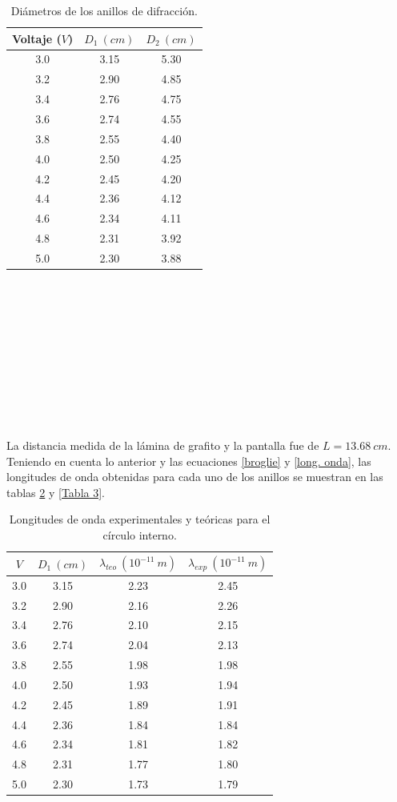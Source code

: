 \documentclass[prb,aps,twocolumn,preprintnumbers,amsmath,amssymb]{revtex4}
\begin{document}
\begin{table}[h!]
	\caption{\label{Tabla 1}Diámetros de los anillos de difracción.}
	\begin{ruledtabular}
		\begin{tabular}{|ccc|}
			Voltaje ($V$) & $D_{1}\ (cm)$ & $D_{2}\ (cm)$\\
			\hline
			3.0 & 3.15 & 5.30\\
			3.2 & 2.90 & 4.85\\
			3.4 & 2.76 & 4.75\\
			3.6 & 2.74 & 4.55\\
			3.8 & 2.55 & 4.40\\
			4.0 & 2.50 & 4.25\\
			4.2 & 2.45 & 4.20\\
			4.4 & 2.36 & 4.12\\
			4.6 & 2.34 & 4.11\\
			4.8 & 2.31 & 3.92\\
			5.0 & 2.30 & 3.88\\
		\end{tabular}
	\end{ruledtabular}
\end{table}
\
\\\\\\\\\\\\\\\\\\\\
La distancia medida	de la lámina de grafito y la pantalla fue de $L = 13.68\ cm$. Teniendo en cuenta lo anterior y las ecuaciones \eqref{broglie} y \eqref{long. onda}, las longitudes de onda obtenidas para cada uno de los anillos se muestran en las tablas \ref{Tabla 2} y \ref{Tabla 3}.

\begin{table}[h!]
	\caption{\label{Tabla 2}Longitudes de onda experimentales y teóricas para el círculo interno.}
	\begin{ruledtabular}
		\begin{tabular}{|cccc|}
			$V$ & $D_{1}\ (cm)$ & $\lambda_{teo}\ (10^{-11}\ m)$ & $\lambda_{exp}\ (10^{-11}\ m)$\\
			\hline
			3.0 & 3.15 & 2.23 & 2.45\\
			3.2 & 2.90 & 2.16 & 2.26\\
			3.4 & 2.76 & 2.10 & 2.15\\
			3.6 & 2.74 & 2.04 & 2.13\\
			3.8 & 2.55 & 1.98 & 1.98\\
			4.0 & 2.50 & 1.93 & 1.94\\
			4.2 & 2.45 & 1.89 & 1.91\\
			4.4 & 2.36 & 1.84 & 1.84\\
			4.6 & 2.34 & 1.81 & 1.82\\
			4.8 & 2.31 & 1.77 & 1.80\\
			5.0 & 2.30 & 1.73 & 1.79\\
		\end{tabular}
	\end{ruledtabular}
\end{table}
\end{document}

